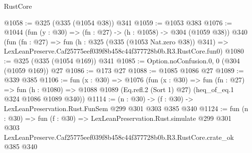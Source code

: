 \begin{lexlean}{RustCore}
\begin{coremodule}
@1058 := @325 (@335 (@1054 @38)) @341
@1059 := @1053 @383
@1076 := @1044
    (fun (y : @30) => (fn : @27) -> (h : @1058) -> @304 (@1059 @38))
    @340
    (fun (fn : @27) =>
    fun (h : @325 (@335 (@1053 Nat.zero @38)) @341) =>
    LexLeanPreserve.Caf25775eef039f8b458c44f377728b0b.R3.RustCore.fun0)
@1080 := @325 (@335 (@1054 @169)) @341
@1085 := Option.noConfusion.{0, 0} (@304 (@1059 @169)) @27
@1086 := @173 @27
@1088 := @1085 @1086 @27
@1089 := @339 @385
@1106 := fun (x : @30) =>
  @1076
    (fun (x : @30) =>
    fun (fn : @27) =>
    fun (h : @1080) => @1088 @1089 (Eq.refl.{2} (Sort 1) @27) (heq_of_eq.{1} @324 @1086 @1089 @340))
@1114 := (n : @30) -> (f : @30) -> LexLeanPreservation.Rust.FunSem @299 @301 @303 @385 @340
@1124 := fun (n : @30) =>
  fun (f : @30) =>
  LexLeanPreservation.Rust.simulate
    @299
    @301
    @303
    LexLeanPreserve.Caf25775eef039f8b458c44f377728b0b.R3.RustCore.crate_ok
    @385
    @340
\end{coremodule}
\end{lexlean}
